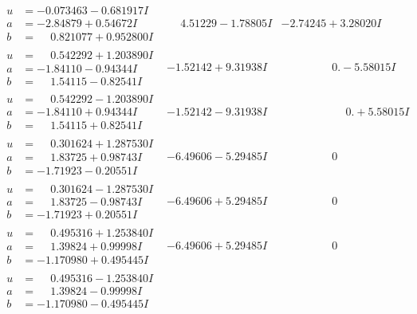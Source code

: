 \documentclass[1p]{elsarticle_modified}
\theoremstyle{definition}
\begin{document}
$$\begin{array}{c|c|c}
\begin{aligned}
u &= -0.073463 - 0.681917 I \\
a &= -2.84879 + 0.54672 I \\
b &= \phantom{-}0.821077 + 0.952800 I\end{aligned}
 & \phantom{-}4.51229 - 1.78805 I & -2.74245 + 3.28020 I \\ \hline\begin{aligned}
u &= \phantom{-}0.542292 + 1.203890 I \\
a &= -1.84110 - 0.94344 I \\
b &= \phantom{-}1.54115 - 0.82541 I\end{aligned}
 & -1.52142 + 9.31938 I & \phantom{-0.000000 } 0. - 5.58015 I \\ \hline\begin{aligned}
u &= \phantom{-}0.542292 - 1.203890 I \\
a &= -1.84110 + 0.94344 I \\
b &= \phantom{-}1.54115 + 0.82541 I\end{aligned}
 & -1.52142 - 9.31938 I & \phantom{-0.000000 -}0. + 5.58015 I \\ \hline\begin{aligned}
u &= \phantom{-}0.301624 + 1.287530 I \\
a &= \phantom{-}1.83725 + 0.98743 I \\
b &= -1.71923 - 0.20551 I\end{aligned}
 & -6.49606 - 5.29485 I & \phantom{-0.000000 } 0 \\ \hline\begin{aligned}
u &= \phantom{-}0.301624 - 1.287530 I \\
a &= \phantom{-}1.83725 - 0.98743 I \\
b &= -1.71923 + 0.20551 I\end{aligned}
 & -6.49606 + 5.29485 I & \phantom{-0.000000 } 0 \\ \hline\begin{aligned}
u &= \phantom{-}0.495316 + 1.253840 I \\
a &= \phantom{-}1.39824 + 0.99998 I \\
b &= -1.170980 + 0.495445 I\end{aligned}
 & -6.49606 + 5.29485 I & \phantom{-0.000000 } 0 \\ \hline\begin{aligned}
u &= \phantom{-}0.495316 - 1.253840 I \\
a &= \phantom{-}1.39824 - 0.99998 I \\
b &= -1.170980 - 0.495445 I\end{aligned}

\end{array}$$
\end{document}
